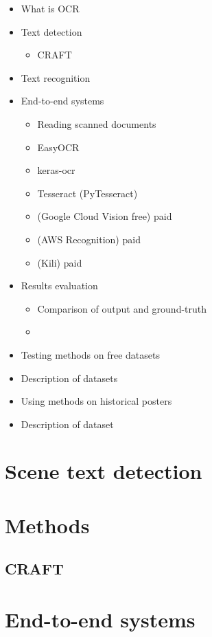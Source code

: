 
\begin{itemize}
    \item What is OCR
    \item Text detection
    \begin{itemize}
        \item CRAFT
    \end{itemize}
    \item Text recognition
    \item End-to-end systems
    \begin{itemize}
        \item[] Reading scanned documents
        \item EasyOCR
        \item keras-ocr
        \item Tesseract (PyTesseract)
        \item (Google Cloud Vision free) paid
        \item (AWS Recognition) paid 
        \item (Kili) paid
    \end{itemize}
    \item Results evaluation
    \begin{itemize}
        \item Comparison of output and ground-truth
        \item 
    \end{itemize}
    \item Testing methods on free datasets
    \item[] Description of datasets
    \item Using methods on historical posters    
    \item[] Description of dataset

\end{itemize}


\section{Scene text detection}

\section*{Methods}
\subsection{CRAFT}

\section{End-to-end systems}
